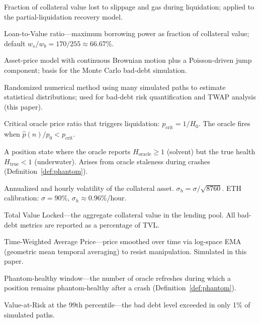 \documentclass[10pt,a4paper,twocolumn]{article}
\begin{document}
\begin{description}[style=nextline, font=\normalfont\bfseries, leftmargin=1.5em]
\item[Liquidation-Recovery Haircut ($\kappa$)\,$\dagger$] Fraction of collateral value lost to slippage and gas during liquidation; applied to the partial-liquidation recovery model.

\item[LTV] Loan-to-Value ratio---maximum borrowing power as fraction of collateral value; default $w_s/w_b = 170/255 \approx 66.67\%$.

\item[Merton Jump-Diffusion] Asset-price model with continuous Brownian motion plus a Poisson-driven jump component; basis for the Monte Carlo bad-debt simulation.

\item[Monte Carlo Simulation] Randomized numerical method using many simulated paths to estimate statistical distributions; used for bad-debt risk quantification and TWAP analysis (this paper).

\item[$p_{\text{crit}}$\,$\dagger$] Critical oracle price ratio that triggers liquidation: $p_{\text{crit}} = 1 / H_0$. The oracle fires when $\hat{p}(n)/p_0 < p_{\text{crit}}$.

\item[Phantom-healthy\,$\dagger$] A position state where the oracle reports $H_{\text{oracle}} \geq 1$ (solvent) but the true health $H_{\text{true}} < 1$ (underwater). Arises from oracle staleness during crashes (Definition~\ref{def:phantom}).

\item[$\sigma$, $\sigma_h$\,$\dagger$] Annualized and hourly volatility of the collateral asset. $\sigma_h = \sigma / \sqrt{8760}$. ETH calibration: $\sigma = 90\%$, $\sigma_h \approx 0.96\%$/hour.

\item[TVL\,$\dagger$] Total Value Locked---the aggregate collateral value in the lending pool. All bad-debt metrics are reported as a percentage of TVL.

\item[TWAP] Time-Weighted Average Price---price smoothed over time via log-space EMA (geometric mean temporal averaging) to resist manipulation. Simulated in this paper.

\item[$W$\,$\dagger$] Phantom-healthy window---the number of oracle refreshes during which a position remains phantom-healthy after a crash (Definition~\ref{def:phantom}).

\item[$\text{VaR}(99\%)$\,$\dagger$] Value-at-Risk at the 99th percentile---the bad debt level exceeded in only 1\% of simulated paths.

\end{description}

\clearpage
\ifodd\value{page}\else\thispagestyle{empty}\null\clearpage\fi
\fi
\end{document}
